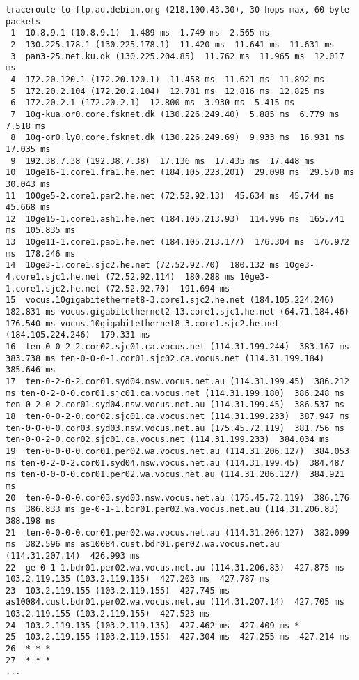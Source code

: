 \documentclass{acm_proc_article-sp}
\begin{document}
\begin{lstlisting}
traceroute to ftp.au.debian.org (218.100.43.30), 30 hops max, 60 byte packets
 1  10.8.9.1 (10.8.9.1)  1.489 ms  1.749 ms  2.565 ms
 2  130.225.178.1 (130.225.178.1)  11.420 ms  11.641 ms  11.631 ms
 3  pan3-25.net.ku.dk (130.225.204.85)  11.762 ms  11.965 ms  12.017 ms
 4  172.20.120.1 (172.20.120.1)  11.458 ms  11.621 ms  11.892 ms
 5  172.20.2.104 (172.20.2.104)  12.781 ms  12.816 ms  12.825 ms
 6  172.20.2.1 (172.20.2.1)  12.800 ms  3.930 ms  5.415 ms
 7  10g-kua.or0.core.fsknet.dk (130.226.249.40)  5.885 ms  6.779 ms  7.518 ms
 8  10g-or0.ly0.core.fsknet.dk (130.226.249.69)  9.933 ms  16.931 ms  17.035 ms
 9  192.38.7.38 (192.38.7.38)  17.136 ms  17.435 ms  17.448 ms
10  10ge16-1.core1.fra1.he.net (184.105.223.201)  29.098 ms  29.570 ms  30.043 ms
11  100ge5-2.core1.par2.he.net (72.52.92.13)  45.634 ms  45.744 ms  45.668 ms
12  10ge15-1.core1.ash1.he.net (184.105.213.93)  114.996 ms  165.741 ms  105.835 ms
13  10ge11-1.core1.pao1.he.net (184.105.213.177)  176.304 ms  176.972 ms  178.246 ms
14  10ge3-1.core1.sjc2.he.net (72.52.92.70)  180.132 ms 10ge3-4.core1.sjc1.he.net (72.52.92.114)  180.288 ms 10ge3-1.core1.sjc2.he.net (72.52.92.70)  191.694 ms
15  vocus.10gigabitethernet8-3.core1.sjc2.he.net (184.105.224.246)  182.831 ms vocus.gigabitethernet2-13.core1.sjc1.he.net (64.71.184.46)  176.540 ms vocus.10gigabitethernet8-3.core1.sjc2.he.net (184.105.224.246)  179.331 ms
16  ten-0-0-2-2.cor02.sjc01.ca.vocus.net (114.31.199.244)  383.167 ms  383.738 ms ten-0-0-0-1.cor01.sjc02.ca.vocus.net (114.31.199.184)  385.646 ms
17  ten-0-2-0-2.cor01.syd04.nsw.vocus.net.au (114.31.199.45)  386.212 ms ten-0-2-0-0.cor01.sjc01.ca.vocus.net (114.31.199.180)  386.248 ms ten-0-2-0-2.cor01.syd04.nsw.vocus.net.au (114.31.199.45)  386.537 ms
18  ten-0-0-2-0.cor02.sjc01.ca.vocus.net (114.31.199.233)  387.947 ms ten-0-0-0-0.cor03.syd03.nsw.vocus.net.au (175.45.72.119)  381.756 ms ten-0-0-2-0.cor02.sjc01.ca.vocus.net (114.31.199.233)  384.034 ms
19  ten-0-0-0-0.cor01.per02.wa.vocus.net.au (114.31.206.127)  384.053 ms ten-0-2-0-2.cor01.syd04.nsw.vocus.net.au (114.31.199.45)  384.487 ms ten-0-0-0-0.cor01.per02.wa.vocus.net.au (114.31.206.127)  384.921 ms
20  ten-0-0-0-0.cor03.syd03.nsw.vocus.net.au (175.45.72.119)  386.176 ms  386.833 ms ge-0-1-1.bdr01.per02.wa.vocus.net.au (114.31.206.83)  388.198 ms
21  ten-0-0-0-0.cor01.per02.wa.vocus.net.au (114.31.206.127)  382.099 ms  382.596 ms as10084.cust.bdr01.per02.wa.vocus.net.au (114.31.207.14)  426.993 ms
22  ge-0-1-1.bdr01.per02.wa.vocus.net.au (114.31.206.83)  427.875 ms 103.2.119.135 (103.2.119.135)  427.203 ms  427.787 ms
23  103.2.119.155 (103.2.119.155)  427.745 ms as10084.cust.bdr01.per02.wa.vocus.net.au (114.31.207.14)  427.705 ms 103.2.119.155 (103.2.119.155)  427.523 ms
24  103.2.119.135 (103.2.119.135)  427.462 ms  427.409 ms *
25  103.2.119.155 (103.2.119.155)  427.304 ms  427.255 ms  427.214 ms
26  * * *
27  * * *
...
\end{lstlisting}
\end{document}
